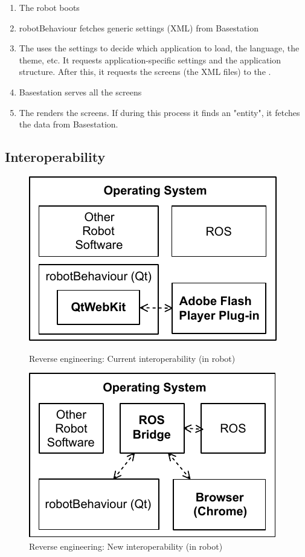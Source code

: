 \begin{enumerate}
    \item The robot boots
    \item robotBehaviour fetches generic settings (\ac{XML}) from Basestation
    \item The \cm uses the settings to decide which application to load, the language, the theme, etc. It requests application-specific settings and the application structure. After this, it requests the screens (the \ac{XML} files) to the \flangobe .
    \item Basestation serves all the screens
    \item The \cm renders the screens. If during this process it finds an "entity", it fetches the data from Basestation.
\end{enumerate}

\FloatBarrier

\subsection{Interoperability}
\label{sec:interoperability}
\begin{figure}[htb]
  \begin{minipage}{0.5\linewidth} 
      \centering
      \includegraphics{figures/interoperability-original.pdf}
      \caption{Reverse engineering: Current interoperability  (in robot)}
      \label{fig:interoperability-original}
  \end{minipage}
  \hspace{0.5cm}
  \begin{minipage}{0.5\linewidth} 
      \centering
      \includegraphics{figures/interoperability-new.pdf}
      \caption{Reverse engineering: New interoperability  (in robot)}
      \label{fig:interoperability-new}
  \end{minipage}
\end{figure}

